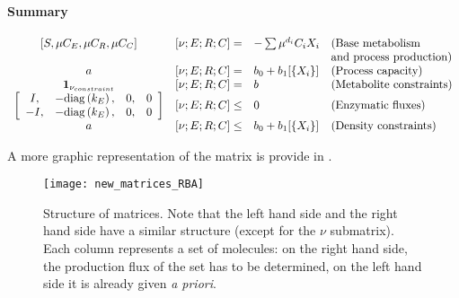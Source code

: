\paragraph{Summary}

\[
\begin{array}{ccll}
  [S, \mu C_E, \mu C_R, \mu C_C] & [\nu;E;R;C] = & 
  - \sum \mu^{d_i}C_i X_i & \textrm{(Base metabolism}\\
  & & & \textrm{and process production)} \\
  a & [\nu; E; R; C] = & b_0 + b_1 [\{X_i\}] & \textrm{(Process capacity)}\\
  \mathbf{1}_{\nu_{constraint}} & [\nu; E; R; C] = & b & \textrm{(Metabolite constraints)} \\
  \left[
    \begin{array}{cccc}
      I, & -\mathrm{diag}\left(k_E\right), & 0, & 0 \\
      -I, & -\mathrm{diag}\left(k_E\right), & 0, & 0
    \end{array}
    \right] & [\nu; E;R;C] \leq & 0 & \textrm{(Enzymatic fluxes)}\\
  a & [\nu; E; R; C] \leq & b_0 + b_1 [\{X_i\}] & \textrm{(Density constraints)} \\
\end{array}	
\]

A more graphic representation of the matrix is provide in .

\begin{figure}[ht]
  \centering
  \texttt{[image: new\_matrices\_RBA]}
  \caption{Structure of matrices. Note that the left hand side and the right hand side have a similar structure (except for the $\nu$ submatrix). Each column represents a set of molecules: on the right hand side, the production flux of the set has to be determined, on the left hand side it is already given \textit{a priori}.}
  \label{fig:new_matrices_rba}
\end{figure}
